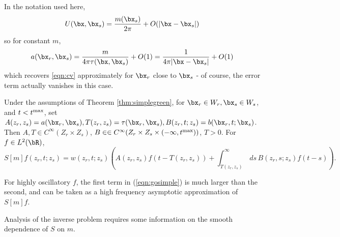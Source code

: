 \begin{rem}
In the notation used here, 
\[
U(\bx,\bx_s) = \frac{m(\bx_s)}{2\pi} + O(|\bx-\bx_s|)
\]
so for constant $m$,
\[
a(\bx_r,\bx_s) = \frac{m}{4\pi\tau(\bx,\bx_s)} +
O(1)=\frac{1}{4\pi|\bx-\bx_s|} + O(1)
\]
which recovers \ref{eqn:cv} approximately for $\bx_r$ close to $\bx_s$
- of course, the error term actually vanishes in this case.
\end{rem}

\begin{cor}
\label{thm:gosimple}
Under the assumptions of Theorem \ref{thm:simplegreen}, 
for $\bx_r \in W_r, \bx_s \in W_s$, and $t < t^{\rm max}$, set $A(z_r,z_s) = a(\bx_r,\bx_s),
T(z_r,z_s)=\tau(\bx_r,\bx_s), B(z_r,t;z_s) = b(\bx_r,t;\bx_s)$. Then
$A,T \in C^{\infty}(Z_r \times 
Z_s)$,
$B \in \in C^{\infty}(Z_r \times Z_s\times (-\infty,t^{\rm max}))$, $T>0$. For $f \in
L^2(\bR)$,
\begin{equation}
\label{eqn:gosimple} 
S[m]f (z_r,t;z_s) = w(z_r,t;z_s)\left(A(z_r,z_s)f(t-T(z_r,z_s)) + \int_{T(z_r,z_s)}^{\infty}
\,ds\,B(z_r,s;z_s)f(t-s)\right). 
\end{equation}
\end{cor}

For highly oscillatory $f$, the first term in (\ref{eqn:gosimple}) is much
larger than the second, and can be taken as a high frequency
asymptotic approximation of $S[m]f$. 

Analysis of the inverse problem requires some information on 
the smooth dependence of $S$ on $m$. 

